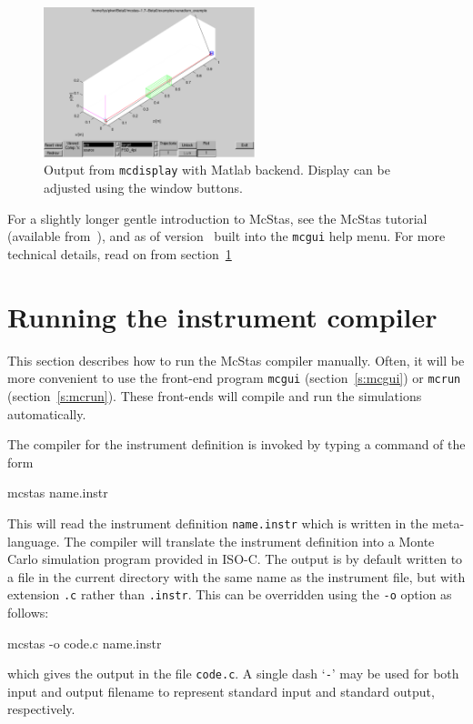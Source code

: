 \begin{figure}[htb!]
  \begin{center}
    \includegraphics[width=0.55\textwidth]{figures/mcdisplay_Matlab}
  \end{center}
  \caption{Output from \texttt{mcdisplay} with Matlab backend. Display can be
    adjusted using the window buttons.}
\label{fig:mcdisp_Matlab}
\end{figure}

For a slightly longer gentle introduction to McStas, see the McStas tutorial
(available from~\cite{mcstas_webpage}), and as of version \version\ built into
the \verb+mcgui+ help menu. For more technical details, read on from
section~\ref{s:running}



\section{Running the instrument compiler}
\label{s:running}

This section describes how to run the McStas compiler manually. Often,
it will be more convenient to use the front-end program \verb+mcgui+
(section~\ref{s:mcgui}) or \verb+mcrun+ (section~\ref{s:mcrun}). These
front-ends will compile and run the simulations automatically.

The compiler for the \MCS{} instrument definition
is invoked by typing a command of the form
\begin{bash}
    mcstas name.instr
\end{bash}
This will read the instrument definition \verb+name.instr+ which is
written in the \MCS meta-language. The compiler will translate the
instrument definition into a Monte Carlo simulation program provided in
ISO-C. The output is by default written to a file in the current
directory with the same name as the instrument file, but with extension
\verb+.c+ rather than \verb+.instr+. This can be overridden using the
\verb+-o+ option as follows:
\begin{bash}
    mcstas -o code.c name.instr
\end{bash}
which gives the output in the file \verb+code.c+.
A single dash `\verb+-+' may be used for both input and output filename
to represent standard input and standard output, respectively.


